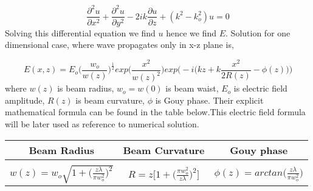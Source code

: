 \documentclass{article}
\begin{document}
	\begin{equation}
	\frac{\partial^2 u}{\partial x^2}+ \frac{\partial^2 u}{\partial y^2} - 2ik\frac{\partial u}{\partial z}+(k^2-k_o^2)u=0
	\end{equation}
	Solving this differential equation we find $u$ hence we find $E$. Solution for one dimensional case, where wave propagates only in x-z plane is,
	
	\[E(x,z)=E_o\bigg(\frac{w_o}{w(z)}\bigg)^{\frac{1}{2}}exp\bigg(\frac{x^2}{w(z)^2}\bigg)exp\bigg(-i\Big(kz+k\frac{x^2}{2R(z)}-\phi(z)\Big)\bigg)\]
	where
	$w(z)$ is beam radius, $w_o = w(0)$ is beam waist, $E_o$ is electric field amplitude, $R(z)$ is beam curvature, $\phi$ is Gouy phase. Their explicit mathematical formula can be found in the table below.This electric field formula will be later used as reference to numerical solution.
	

	\begin{table}[h!]
		\begin{center}
			\label{tab:table1}
			\begin{tabular}{c| c| c} %
				\textbf{Beam Radius} & \textbf{Beam Curvature} & \textbf{Gouy phase}\\
				\hline
				&&\\
				$w(z)= w_o\sqrt{1+\Big(\frac{z\lambda}{\pi w_o^2}\Big)^2}$ & $R=z\bigg[1+\Big(\frac{\pi w_o^2}{z\lambda}\Big)^2\bigg]$ & $\phi(z)=arctan\Big(\frac{z\lambda}{\pi w_o^2}\Big)$\\
			\end{tabular}
		\end{center}
	\end{table}
	
\end{document}

